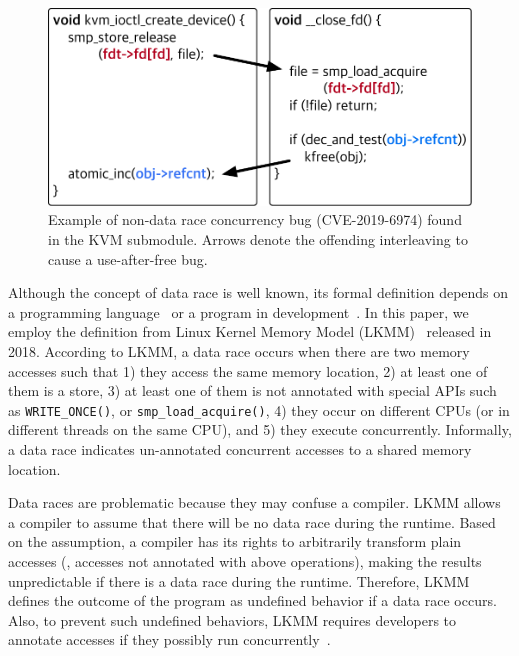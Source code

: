 \begin{figure}
  \centering
  \includegraphics[width=0.85\linewidth]{fig/racecondition.pdf}
  \caption{Example of non-data race concurrency bug (CVE-2019-6974)
    found in the KVM submodule. Arrows denote the offending
    interleaving to cause a use-after-free bug.}
  \label{fig:concurrencybugs}
\end{figure}


%
Although the concept of data race is well known, its formal definition
depends on a programming language~\cite{C-standard-n2310,
  java-standard} or a program in development~\cite{lkmm}. In this
paper, we employ the definition from Linux Kernel Memory Model
(LKMM)~\cite{lkmm} released in 2018. According to LKMM, a data race
occurs when there are two memory accesses such that 1) they access the
same memory location, 2) at least one of them is a store, 3) at least
one of them is not annotated with special APIs such as
\texttt{WRITE_ONCE()}, or \texttt{smp_load_acquire()}, 4) they occur
on different CPUs (or in different threads on the same CPU), and 5)
they execute concurrently.
%
Informally, a data race indicates un-annotated concurrent accesses to
a shared memory location.

Data races are problematic because they may confuse a compiler.  LKMM
allows a compiler to assume that there will be no data race during the
runtime. Based on the assumption, a compiler has its rights to
arbitrarily transform plain accesses (\ie, accesses not annotated with
above operations), making the results unpredictable if there is a data
race during the runtime.
%
Therefore, LKMM defines the outcome of the program as undefined
behavior if a data race occurs.
%
Also, to prevent such undefined behaviors, LKMM requires developers to
annotate accesses if they possibly run
concurrently~\cite{data-race-fix1, data-race-fix2, data-race-fix3}.



